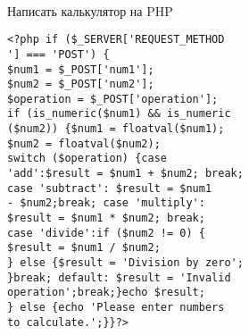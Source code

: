 \documentclass{article}
\begin{document}
\\
\begin{minipage}{.2\textwidth}
Написать калькулятор на PHP
\begin{lstlisting}
<?php if ($_SERVER['REQUEST_METHOD
'] === 'POST') {
$num1 = $_POST['num1'];
$num2 = $_POST['num2'];
$operation = $_POST['operation'];
if (is_numeric($num1) && is_numeric
($num2)) {$num1 = floatval($num1);
$num2 = floatval($num2);
switch ($operation) {case 
'add':$result = $num1 + $num2; break;
case 'subtract': $result = $num1 
- $num2;break; case 'multiply':
$result = $num1 * $num2; break;
case 'divide':if ($num2 != 0) {
$result = $num1 / $num2;
} else {$result = 'Division by zero';
}break; default: $result = 'Invalid 
operation';break;}echo $result;
} else {echo 'Please enter numbers 
to calculate.';}}?>
\end{lstlisting}
\end{minipage}
\end{document}
